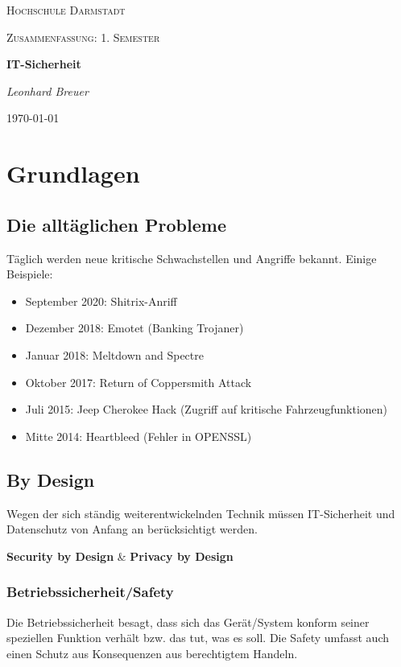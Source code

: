 \documentclass{book}
\begin{document}
\begin{titlepage}
    \centering
	{\LARGE \textsc{Hochschule Darmstadt}\par}
	\vspace{1cm}
	{\Large \textsc{Zusammenfassung: 1. Semester}\par}
	\vspace{1.5cm}
	{\huge\bfseries IT-Sicherheit\par}
	\vspace{2cm}
	{\Large\itshape Leonhard Breuer\par}

	{\large \today\par}
\end{titlepage}
\tableofcontents
\chapter{Grundlagen}
\section{Die alltäglichen Probleme}
Täglich werden neue kritische Schwachstellen und Angriffe bekannt. Einige Beispiele:
\begin{itemize}
    \item September 2020: Shitrix-Anriff
    \item Dezember 2018: Emotet (Banking Trojaner)
    \item Januar 2018: Meltdown and Spectre 
    \item Oktober 2017: Return of Coppersmith Attack 
    \item Juli 2015: Jeep Cherokee Hack (Zugriff auf kritische Fahrzeugfunktionen)
    \item Mitte 2014: Heartbleed (Fehler in OPENSSL)
\end{itemize}
\section{By Design}
Wegen der sich ständig weiterentwickelnden Technik müssen IT-Sicherheit und Datenschutz von Anfang an berücksichtigt werden. \\
\begin{center}
\textbf{Security by Design} \& \textbf{Privacy by Design}
\end{center}
\subsection{Betriebssicherheit/Safety}
Die Betriebssicherheit besagt, dass sich das Gerät/System konform seiner speziellen Funktion verhält bzw. das tut, was es soll.
Die Safety umfasst auch einen Schutz aus Konsequenzen aus berechtigtem Handeln.
\end{document}
